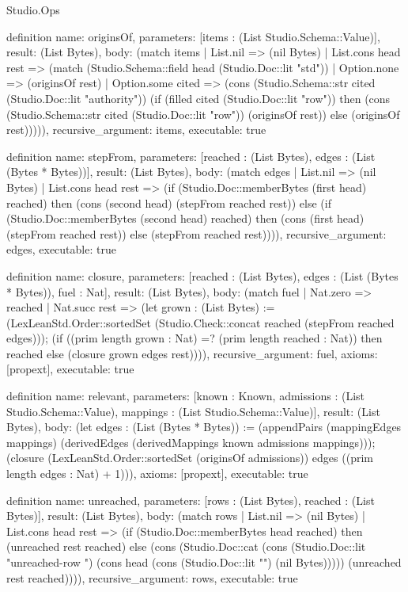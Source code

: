 \begin{lexlean}{Studio.Ops}
\begin{semanticmodule}
{definition{
  name: originsOf,
  parameters: [items : (List Studio.Schema::Value)],
  result: (List Bytes),
  body: (match items
    | List.nil => (nil Bytes)
    | List.cons head rest => (match (Studio.Schema::field head (Studio.Doc::lit "std"))
      | Option.none => (originsOf rest)
      | Option.some cited => (cons (Studio.Schema::str cited (Studio.Doc::lit "authority")) (if (filled cited (Studio.Doc::lit "row")) then (cons (Studio.Schema::str cited (Studio.Doc::lit "row")) (originsOf rest)) else (originsOf rest))))),
  recursive_argument: items,
  executable: true
}

definition{
  name: stepFrom,
  parameters: [reached : (List Bytes), edges : (List (Bytes * Bytes))],
  result: (List Bytes),
  body: (match edges
    | List.nil => (nil Bytes)
    | List.cons head rest => (if (Studio.Doc::memberBytes (first head) reached) then (cons (second head) (stepFrom reached rest)) else (if (Studio.Doc::memberBytes (second head) reached) then (cons (first head) (stepFrom reached rest)) else (stepFrom reached rest)))),
  recursive_argument: edges,
  executable: true
}

definition{
  name: closure,
  parameters: [reached : (List Bytes), edges : (List (Bytes * Bytes)), fuel : Nat],
  result: (List Bytes),
  body: (match fuel
    | Nat.zero => reached
    | Nat.succ rest => (let grown : (List Bytes) := (LexLeanStd.Order::sortedSet (Studio.Check::concat reached (stepFrom reached edges))); (if ((prim length grown : Nat) =? (prim length reached : Nat)) then reached else (closure grown edges rest)))),
  recursive_argument: fuel,
  axioms: [propext],
  executable: true
}

definition{
  name: relevant,
  parameters: [known : Known, admissions : (List Studio.Schema::Value), mappings : (List Studio.Schema::Value)],
  result: (List Bytes),
  body: (let edges : (List (Bytes * Bytes)) := (appendPairs (mappingEdges mappings) (derivedEdges (derivedMappings known admissions mappings))); (closure (LexLeanStd.Order::sortedSet (originsOf admissions)) edges ((prim length edges : Nat) + 1))),
  axioms: [propext],
  executable: true
}

definition{
  name: unreached,
  parameters: [rows : (List Bytes), reached : (List Bytes)],
  result: (List Bytes),
  body: (match rows
    | List.nil => (nil Bytes)
    | List.cons head rest => (if (Studio.Doc::memberBytes head reached) then (unreached rest reached) else (cons (Studio.Doc::cat (cons (Studio.Doc::lit "unreached-row ") (cons head (cons (Studio.Doc::lit "\n") (nil Bytes))))) (unreached rest reached)))),
  recursive_argument: rows,
  executable: true
}

}
\end{semanticmodule}
\end{lexlean}

